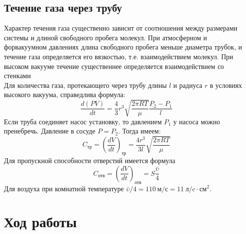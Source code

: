 \documentclass[12pt,a4paper]{article}
\begin{document}
\subsection*{Течение газа через трубу}
Характер течения газа существенно зависит от соотношения между размерами системы и длиной свободного пробега молекул. При атмосферном и форвакуумном давлениях  длина свободного пробега меньше диаметра трубок, и течение газа определяется его вязкостью, т.е. взаимодействием молекул. При высоком вакууме течение существеннее определяется взаимодействием со стенками \\
Для количества газа, протекающего через трубу длины $l$ и радиуса $r$ в условиях высокого вакуума, справедлива формула:
\begin{equation}
	\frac{d(PV)}{dt} = \frac{4}{3}r^3\sqrt{\frac{2\pi RT}{\mu}}\frac{P_2 - P_1}{l}
\end{equation}
Если труба соединяет насос установку, то давлением $P_1$ у насоса можно пренебречь. Давление в сосуде $P = P_2$. Тогда имеем:
\begin{equation}
C_\text{тр} = \left(\frac{dV}{dt}\right)_\text{тр} = \frac{4r^3}{3l}\sqrt{\frac{2\pi RT}{\mu}}
\end{equation}
Для пропускной способности отверстий имеется формула
\begin{equation}
C_\text{отв} = \left(\frac{dV}{dt}\right)_\text{отв} = S\frac{\bar{\upsilon}}{4}
\end{equation}
Для воздуха при комнатной температуре $\bar{\upsilon}/4 = 110~\text{м/с} = 11~\text{л/c}\cdot\text{см}^2$.
\newpage
\section{Ход работы}
\end{document}
